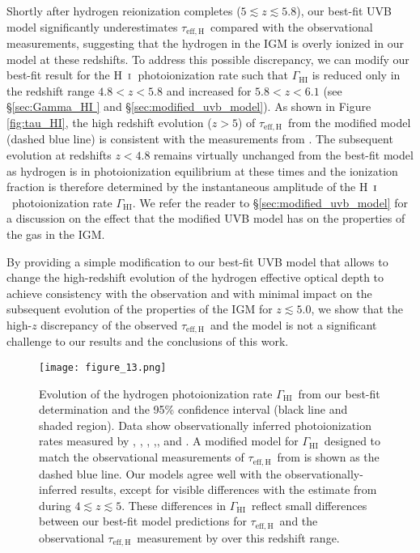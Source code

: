 \documentclass[twocolumn]{aastex62}
\def\HI{\hbox{\rm H~$\scriptstyle\rm I$}}
\newcommand\GammaHI{$\Gamma_{\mathrm{HI}}$~}
\newcommand\taueffH{$\tau_{\mathrm{eff,H}}$~}
\begin{document}
Shortly after hydrogen reionization completes ($5 \lesssim z \lesssim 5.8$),
our best-fit UVB model significantly underestimates \taueffH  compared with 
the observational measurements, suggesting that the hydrogen in the IGM is
overly ionized in our model at these redshifts.
To address this possible discrepancy, we can modify our best-fit result for the \HI\ 
photoionization rate such that $\Gamma_\mathrm{HI}$ is
reduced only in the redshift range $4.8 < z < 5.8$ and increased for $5.8 < z < 6.1$ (see \S \ref{sec:Gamma_HI } and \S \ref{sec:modified_uvb_model}). 
As shown in Figure \ref{fig:tau_HI}, the high redshift evolution ($z>5$) of  \taueffH from the modified model (dashed blue line) is consistent with the measurements from \cite{Bosman_2018}.
The subsequent evolution at redshifts $z<4.8$ remains virtually unchanged from the
best-fit model as hydrogen is in photoionization equilibrium at these times
and the ionization fraction is therefore determined
by the instantaneous amplitude of the \HI\ photoionization rate $\Gamma_\mathrm{HI}$.
We refer the reader to \S \ref{sec:modified_uvb_model} for a discussion on the effect that the
modified UVB model has on the properties of the gas in the IGM. 

By providing a simple modification to our best-fit UVB model that allows to change the high-redshift evolution of the hydrogen effective optical depth 
to achieve consistency with the observation and with minimal impact on the subsequent evolution of the properties of the IGM for $z\lesssim 5.0$, 
we show that the high-$z$ discrepancy of the observed \taueffH and the model is not a significant challenge to our results and the conclusions of this work.     

\begin{figure}
\texttt{[image: figure\_13.png]}
\caption{ Evolution of the hydrogen photoionization rate \GammaHI from our best-fit determination and the 95\% confidence interval (black line and shaded region).
Data show observationally
inferred photoionization rates
measured by \cite{Calverley+2011}, \cite{Wyite+2011}, \cite{Becker+2013b}, \cite{Gaikwad+2017},\cite{daloisio2018a}, and \cite{Gallego+2021}. A modified model 
for \GammaHI designed to match the observational measurements of \taueffH from \citet[][see Figure \ref{fig:tau_HI}]{Bosman_2018} is shown as the dashed blue line.
Our models agree well with the observationally-inferred results,
except for visible differences
with the estimate from \cite{Becker+2013b} during $4 \lesssim z \lesssim 5$.
These differences in \GammaHI reflect
small differences between our best-fit model predictions for \taueffH and
the observational \taueffH measurement by \cite{Becker+2013a} over this redshift range.}
\label{fig:Gamma_HI}
\end{figure}
\end{document}
